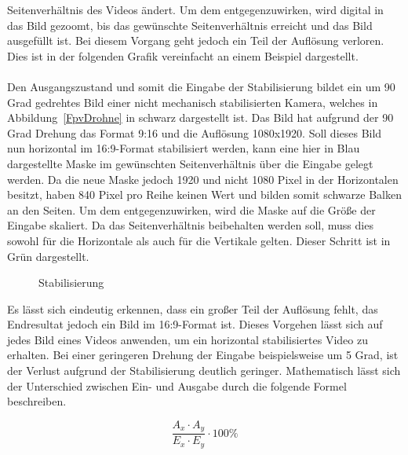     Seitenverhältnis des Videos ändert. Um dem entgegenzuwirken, wird digital in das Bild gezoomt,
    bis das gewünschte Seitenverhältnis erreicht und das Bild ausgefüllt ist. Bei diesem Vorgang
    geht jedoch ein Teil der Auflösung verloren. Dies ist in der folgenden Grafik vereinfacht an
    einem Beispiel dargestellt. \\
    \\
    Den Ausgangszustand und somit die Eingabe der Stabilisierung bildet ein um 90 Grad gedrehtes
    Bild einer nicht mechanisch stabilisierten Kamera, welches in Abbildung~\ref*{FpvDrohne} in schwarz dargestellt
    ist. Das Bild hat aufgrund der 90 Grad Drehung das Format 9:16 und die Auflösung 1080x1920. Soll
    dieses Bild nun horizontal im 16:9-Format stabilisiert werden, kann eine hier in Blau dargestellte
    Maske im gewünschten Seitenverhältnis über die Eingabe gelegt werden. Da die neue Maske jedoch 1920
    und nicht 1080 Pixel in der Horizontalen besitzt, haben 840 Pixel pro Reihe keinen Wert und bilden
    somit schwarze Balken an den Seiten. Um dem entgegenzuwirken, wird die Maske auf die Größe der
    Eingabe skaliert. Da das Seitenverhältnis beibehalten werden soll, muss dies sowohl für die
    Horizontale als auch für die Vertikale gelten. Dieser Schritt ist in Grün dargestellt.

    \begin{figure}[ht]
        \centering
        \def\svgwidth{\linewidth}
        
        \vspace{0.5cm}
        \caption{Stabilisierung}
        \label{stabilisierung}
    \end{figure}
    
    Es lässt sich eindeutig erkennen, dass ein großer Teil der Auflösung fehlt, das Endresultat jedoch
    ein Bild im 16:9-Format ist. Dieses Vorgehen lässt sich auf jedes Bild eines Videos anwenden, um
    ein horizontal stabilisiertes Video zu erhalten. Bei einer geringeren Drehung der Eingabe beispielsweise
    um 5 Grad, ist der Verlust aufgrund der Stabilisierung deutlich geringer. Mathematisch lässt sich
    der Unterschied zwischen Ein- und Ausgabe durch die folgende Formel beschreiben.

    \begin{equation}
        \frac{A_x \cdot A_y}{E_x \cdot E_y} \cdot 100\%
    \end{equation}

